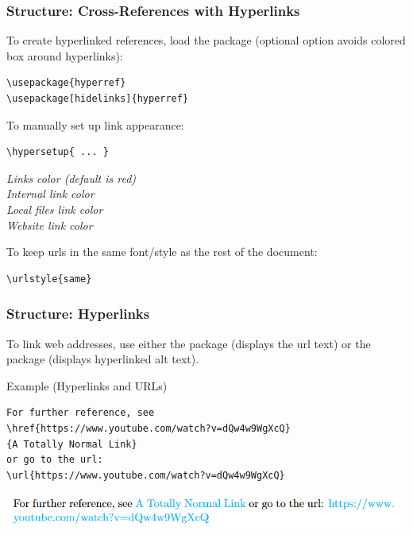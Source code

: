 \begin{frame}[fragile]
\frametitle{Structure: Cross-References with Hyperlinks}
To create hyperlinked references, load the  package (optional  option avoids colored box around hyperlinks):
\begin{exampleblock}{}
\small
\begin{verbatim}
\usepackage{hyperref}  
\usepackage[hidelinks]{hyperref}
\end{verbatim}
\end{exampleblock} \pause
To manually set up link appearance:
\begin{exampleblock}{}
\small
\begin{verbatim}
\hypersetup{ ... }     
\end{verbatim}
\small
{} \textit{Links color (default is red)} \\
 \textit{Internal link color} \\
 \textit{Local files link color} \\
 \textit{Website link color} 
\end{exampleblock} \pause
To keep urls in the same font/style as the rest of the document:
\begin{exampleblock}{}
\small
\begin{verbatim}
\urlstyle{same}
\end{verbatim}
\end{exampleblock}
\end{frame}


\begin{frame}[fragile]
\frametitle{Structure: Hyperlinks}
To link web addresses, use either the  package (displays the url text) or the  package (displays hyperlinked alt text). \pause
\begin{exampleblock}{Example (Hyperlinks and URLs)}
\begin{verbatim}
For further reference, see 
\href{https://www.youtube.com/watch?v=dQw4w9WgXcQ}
{A Totally Normal Link} 
or go to the url: 
\url{https://www.youtube.com/watch?v=dQw4w9WgXcQ}
\end{verbatim}
\end{exampleblock}
\vspace{0.2cm}
\includegraphics[width=\linewidth]{img/hyperlink_ex.png}
\end{frame}



